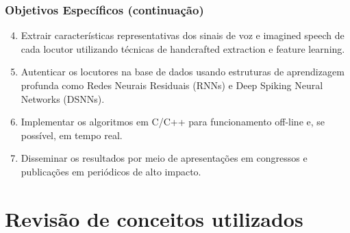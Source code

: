 \documentclass{beamer}
\begin{document}
	\begin{frame}
		\frametitle{Objetivos Específicos (continuação)}
		\begin{enumerate}
			\setcounter{enumi}{3}
			\item Extrair características representativas dos sinais de voz e imagined speech de cada locutor utilizando técnicas de handcrafted extraction e feature learning.
			\item Autenticar os locutores na base de dados usando estruturas de aprendizagem profunda como Redes Neurais Residuais (RNNs) e Deep Spiking Neural Networks (DSNNs).
			\item Implementar os algoritmos em C/C++ para funcionamento off-line e, se possível, em tempo real.
			\item Disseminar os resultados por meio de apresentações em congressos e publicações em periódicos de alto impacto.
		\end{enumerate}
	\end{frame}
		


	\section{Revisão de conceitos utilizados}
\end{document}
